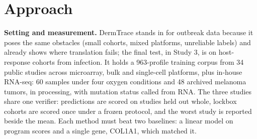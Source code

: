 \documentclass[11pt]{article}
\begin{document}
\section*{Approach}
\textbf{Setting and measurement.} DermTrace stands in for outbreak data because it poses the same obstacles (small cohorts, mixed platforms, unreliable labels) and already shows where translation fails; the final test, in Study 3, is on host-response cohorts from infection. It holds a 963-profile training corpus from 34 public studies across microarray, bulk and single-cell platforms, plus in-house RNA-seq: 60 samples under four oxygen conditions and 48 archived melanoma tumors, in processing, with mutation status called from RNA. The three studies share one verifier: predictions are scored on studies held out whole, lockbox cohorts are scored once under a frozen protocol, and the worst study is reported beside the mean. Each method must beat two baselines: a linear model on program scores and a single gene, COL1A1, which matched it.
\end{document}
